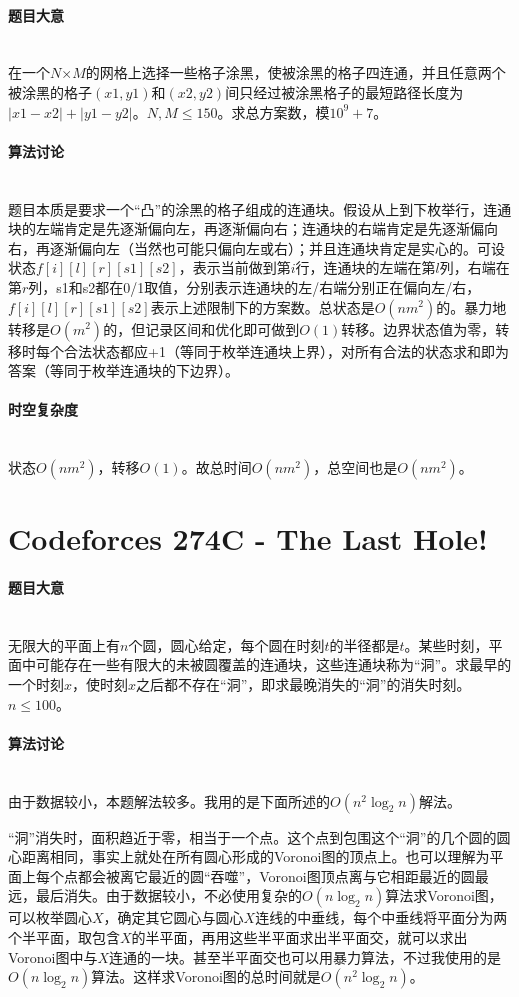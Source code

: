 \documentclass[UTF8]{ctexart}
\newcommand{\myparagraph}[1]{\paragraph{#1}\mbox{}\\}
\theoremstyle{nonumberplain}
\begin{document}
		\myparagraph{题目大意}
		
			在一个$N$×$M$的网格上选择一些格子涂黑，使被涂黑的格子四连通，并且任意两个被涂黑的格子$(x1,y1)$和$(x2,y2)$间只经过被涂黑格子的最短路径长度为$|x1-x2|+|y1-y2|$。$N,M \leq 150$。求总方案数，模$10^9+7$。
		
		\myparagraph{算法讨论}
		
			题目本质是要求一个“凸”的涂黑的格子组成的连通块。假设从上到下枚举行，连通块的左端肯定是先逐渐偏向左，再逐渐偏向右；连通块的右端肯定是先逐渐偏向右，再逐渐偏向左（当然也可能只偏向左或右）；并且连通块肯定是实心的。可设状态$f[i][l][r][s1][s2]$，表示当前做到第$i$行，连通块的左端在第$l$列，右端在第$r$列，s1和s2都在0/1取值，分别表示连通块的左/右端分别正在偏向左/右，$f[i][l][r][s1][s2]$表示上述限制下的方案数。总状态是$O(nm^2)$的。暴力地转移是$O(m^2)$的，但记录区间和优化即可做到$O(1)$转移。边界状态值为零，转移时每个合法状态都应+1（等同于枚举连通块上界），对所有合法的状态求和即为答案（等同于枚举连通块的下边界）。
		
		\myparagraph{时空复杂度}
		
			状态$O(nm^2)$，转移$O(1)$。故总时间$O(nm^2)$，总空间也是$O(nm^2)$。
	
	\section{Codeforces 274C - The Last Hole!}
	
		\myparagraph{题目大意}
		
			无限大的平面上有$n$个圆，圆心给定，每个圆在时刻$t$的半径都是$t$。某些时刻，平面中可能存在一些有限大的未被圆覆盖的连通块，这些连通块称为“洞”。求最早的一个时刻$x$，使时刻$x$之后都不存在“洞”，即求最晚消失的“洞”的消失时刻。$n \leq 100$。
		
		\myparagraph{算法讨论}
		
			由于数据较小，本题解法较多。我用的是下面所述的$O(n^2\log_2n)$解法。
		
			“洞”消失时，面积趋近于零，相当于一个点。这个点到包围这个“洞”的几个圆的圆心距离相同，事实上就处在所有圆心形成的Voronoi图的顶点上。也可以理解为平面上每个点都会被离它最近的圆“吞噬”，Voronoi图顶点离与它相距最近的圆最远，最后消失。由于数据较小，不必使用复杂的$O(n\log_2n)$算法求Voronoi图，可以枚举圆心$X$，确定其它圆心与圆心$X$连线的中垂线，每个中垂线将平面分为两个半平面，取包含$X$的半平面，再用这些半平面求出半平面交，就可以求出Voronoi图中与$X$连通的一块。甚至半平面交也可以用暴力算法，不过我使用的是$O(n\log_2n)$算法。这样求Voronoi图的总时间就是$O(n^2\log_2n)$。
			
\end{document}
